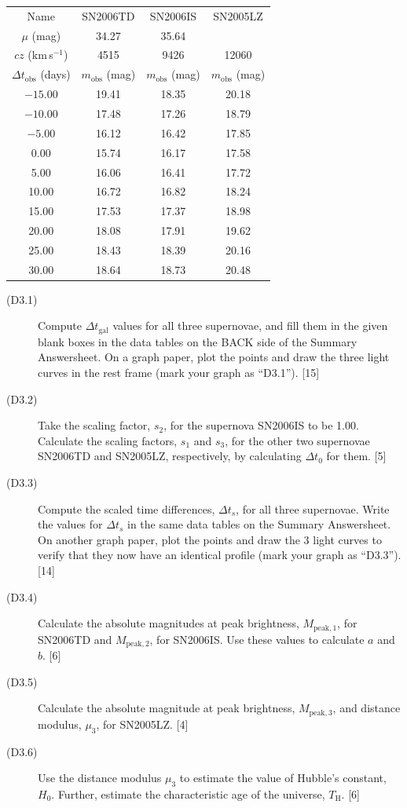 \begin{center}
\begin{tabular}{c|c|c|c}
Name & SN2006TD & SN2006IS & SN2005LZ \\
$\mu$ (mag) & 34.27 & 35.64 & \\
$cz$ (km\,s$^{-1}$) & 4515 & 9426 & 12060 \\
\hline
$\Delta t_{\mathrm{obs}}$ (days) & $m_{\mathrm{obs}}$ (mag)
  & $m_{\mathrm{obs}}$ (mag) & $m_{\mathrm{obs}}$ (mag) \\
\hline
$-15.00$ & 19.41 & 18.35 & 20.18 \\
$-10.00$ & 17.48 & 17.26 & 18.79 \\
$-5.00$  & 16.12 & 16.42 & 17.85 \\
0.00     & 15.74 & 16.17 & 17.58 \\
5.00     & 16.06 & 16.41 & 17.72 \\
10.00    & 16.72 & 16.82 & 18.24 \\
15.00    & 17.53 & 17.37 & 18.98 \\
20.00    & 18.08 & 17.91 & 19.62 \\
25.00    & 18.43 & 18.39 & 20.16 \\
30.00    & 18.64 & 18.73 & 20.48 \\
\end{tabular}
\end{center}

\begin{description}
\item[(D3.1)] Compute $\Delta t_{\mathrm{gal}}$ values for all three
  supernovae, and fill them in the given blank boxes in the data tables on the
  BACK side of the Summary Answersheet. On a graph paper, plot the points and
  draw the three light curves in the rest frame (mark your graph as ``D3.1'').
  \hfill[15]
\item[(D3.2)] Take the scaling factor, $s_2$, for the supernova SN2006IS to be
  1.00. Calculate the scaling factors, $s_1$ and $s_3$, for the other two
  supernovae SN2006TD and SN2005LZ, respectively, by calculating $\Delta t_0$
  for them. \hfill[5]
\item[(D3.3)] Compute the scaled time differences, $\Delta t_s$, for all three
  supernovae. Write the values for $\Delta t_s$ in the same data tables on the
  Summary Answersheet. On another graph paper, plot the points and draw the 3
  light curves to verify that they now have an identical profile (mark your
  graph as ``D3.3''). \hfill[14]
\item[(D3.4)] Calculate the absolute magnitudes at peak brightness,
  $M_{\mathrm{peak},1}$, for SN2006TD and $M_{\mathrm{peak},2}$, for SN2006IS.
  Use these values to calculate $a$ and $b$. \hfill[6]
\item[(D3.5)] Calculate the absolute magnitude at peak brightness,
  $M_{\mathrm{peak},3}$, and distance modulus, $\mu_3$, for SN2005LZ.
  \hfill[4]
\item[(D3.6)] Use the distance modulus $\mu_3$ to estimate the value of
  Hubble's constant, $H_0$. Further, estimate the characteristic age of the
  universe, $T_{\mathrm{H}}$. \hfill[6]
\end{description}
